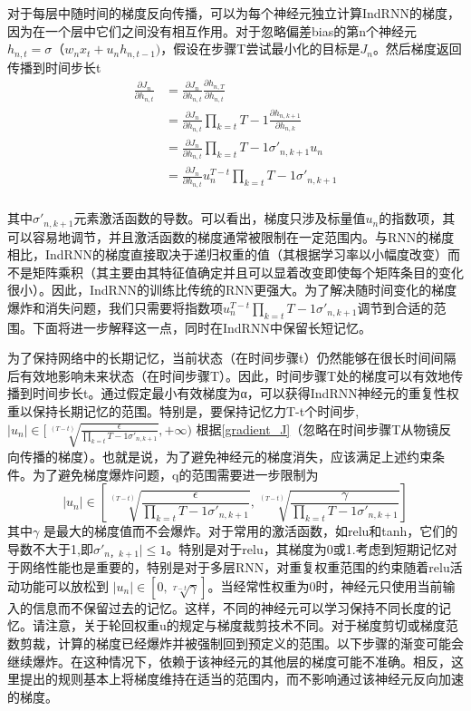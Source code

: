 \documentclass[a4paper,AutoFakeBold,oneside,12pt]{book}
\begin{document}
对于每层中随时间的梯度反向传播，可以为每个神经元独立计算IndRNN的梯度，因为在一个层中它们之间没有相互作用。对于忽略偏差bias的第n个神经元$h_{n,t} =\sigma（w_n x_t + u_n h_{n,t-1})$，假设在步骤T尝试最小化的目标是$J_n$。然后梯度返回传播到时间步长t
\begin{equation}\label{gradient_J}
    \begin{aligned}
        \frac{\partial J_n}{\partial h_{n,t}} & =\frac{\partial J_n}{\partial h_{n,t}} \frac{\partial h_{n,T}}{\partial h_{n,t}} \\
        & = \frac{\partial J_n}{\partial h_{n,t}} \prod_{k=t}{T-1} \frac{\partial h_{n,k+1}}{\partial h_{n,k}} \\
        & = \frac{\partial J_n}{\partial h_{n,t}} \prod_{k=t}{T-1} \sigma \prime_{n, k+1} u_n \\
        & = \frac{\partial J_n}{\partial h_{n,t}} u_{n}^{T-t} \prod_{k=t}{T-1} \sigma \prime_{n, k+1} \\
    \end{aligned}
\end{equation}


其中$\sigma\prime_{n,k+1}$元素激活函数的导数。可以看出，梯度只涉及标量值$u_n$的指数项，其可以容易地调节，并且激活函数的梯度通常被限制在一定范围内。与RNN的梯度相比，IndRNN的梯度直接取决于递归权重的值（其根据学习率以小幅度改变）而不是矩阵乘积（其主要由其特征值确定并且可以显着改变即使每个矩阵条目的变化很小）。因此，IndRNN的训练比传统的RNN更强大。为了解决随时间变化的梯度爆炸和消失问题，我们只需要将指数项$u_n^{T-t} \prod_{k=t}{T-1}\sigma \prime_{n,k+1} $调节到合适的范围。下面将进一步解释这一点，同时在IndRNN中保留长短记忆。

为了保持网络中的长期记忆，当前状态（在时间步骤t）仍然能够在很长时间间隔后有效地影响未来状态（在时间步骤T）。因此，时间步骤T处的梯度可以有效地传播到时间步长t。通过假定最小有效梯度为α，可以获得IndRNN神经元的重复性权重以保持长期记忆的范围。特别是，要保持记忆力T-t个时间步,
$|u_n| \in [\sqrt[(T-t)]{\frac{\epsilon}{\prod_{k=t}{T-1} \sigma \prime_{n, k+1}}},+\infty ) $
根据\eqref{gradient_J}（忽略在时间步骤T从物​​镜反向传播的梯度）。也就是说，为了避免神经元的梯度消失，应该满足上述约束条件。为了避免梯度爆炸问题，q的范围需要进一步限制为$$|u_n| \in [\sqrt[(T-t)]{\frac{\epsilon}{\prod_{k=t}{T-1} \sigma \prime_{n, k+1}}} ,\sqrt[(T-t)]{\frac{\gamma}{\prod_{k=t}{T-1} \sigma \prime_{n, k+1}}}] $$
其中$\gamma $ 是最大的梯度值而不会爆炸。对于常用的激活函数，如relu和tanh，它们的导数不大于1,即$ \sigma \prime_{n，k + 1}| \leq 1 $。特别是对于relu，其梯度为0或1.考虑到短期记忆对于网络性能也是重要的，特别是对于多层RNN，对重复权重范围的约束随着relu活动功能可以放松到 $ |u_n| \in [0, \sqrt[T-t]{\gamma}]$。当经常性权重为0时，神经元只使用当前输入的信息而不保留过去的记忆。这样，不同的神经元可以学习保持不同长度的记忆。请注意，关于轮回权重u的规定与梯度裁剪技术不同。对于梯度剪切或梯度范数剪裁，计算的梯度已经爆炸并被强制回到预定义的范围。以下步骤的渐变可能会继续爆炸。在这种情况下，依赖于该神经元的其他层的梯度可能不准确。相反，这里提出的规则基本上将梯度维持在适当的范围内，而不影响通过该神经元反向加速的梯度。
\end{document}
